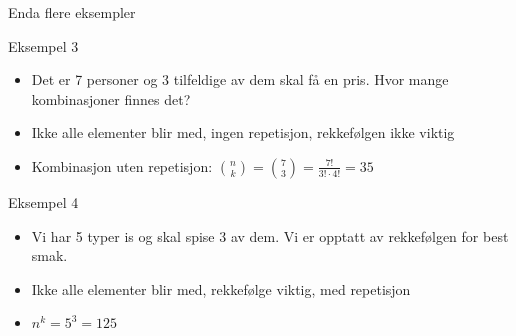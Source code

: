 \begin{frame}{Enda flere eksempler}
\begin{block}{Eksempel 3}
\begin{itemize}
\item Det er 7 personer og 3 tilfeldige av dem skal få en pris. Hvor mange kombinasjoner finnes det?
\item Ikke alle elementer blir med, ingen repetisjon, rekkefølgen ikke viktig 
\item Kombinasjon uten repetisjon: $\binom{n}{k}=\binom{7}{3}=\frac{7!}{3!\cdot 4!}=35$
\end{itemize}
\end{block}
\pause
\begin{block}{Eksempel 4}
\begin{itemize}
\item Vi har 5 typer is og skal spise 3 av dem. Vi er opptatt av rekkefølgen for best smak.
\item Ikke alle elementer blir med, rekkefølge viktig, med repetisjon
\item $n^k=5^3=125$
\end{itemize}
\end{block}
\end{frame}
